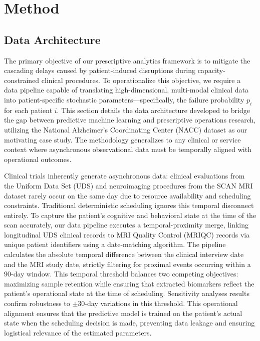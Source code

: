 \newpage
\section{Method}


\subsection{Data Architecture}
\label{sec:data_pipeline}

The primary objective of our prescriptive analytics framework is to mitigate the cascading delays caused by patient-induced disruptions during capacity-constrained clinical procedures. To operationalize this objective, we require a data pipeline capable of translating high-dimensional, multi-modal clinical data into patient-specific stochastic parameters---specifically, the failure probability $p_i$ for each patient $i$. This section details the data architecture developed to bridge the gap between predictive machine learning and prescriptive operations research, utilizing the National Alzheimer's Coordinating Center (NACC) dataset as our motivating case study. The methodology generalizes to any clinical or service context where asynchronous observational data must be temporally aligned with operational outcomes.

Clinical trials inherently generate asynchronous data: clinical evaluations from the Uniform Data Set (UDS) and neuroimaging procedures from the SCAN MRI dataset rarely occur on the same day due to resource availability and scheduling constraints. Traditional deterministic scheduling ignores this temporal disconnect entirely. To capture the patient's cognitive and behavioral state at the time of the scan accurately, our data pipeline executes a temporal-proximity merge, linking longitudinal UDS clinical records to MRI Quality Control (MRIQC) records via unique patient identifiers using a date-matching algorithm. The pipeline calculates the absolute temporal difference between the clinical interview date and the MRI study date, strictly filtering for proximal events occurring within a 90-day window. This temporal threshold balances two competing objectives: maximizing sample retention while ensuring that extracted biomarkers reflect the patient's operational state at the time of scheduling. Sensitivity analyses results confirm robustness to $\pm$30-day variations in this threshold. This operational alignment ensures that the predictive model is trained on the patient's actual state when the scheduling decision is made, preventing data leakage and ensuring logistical relevance of the estimated parameters.

